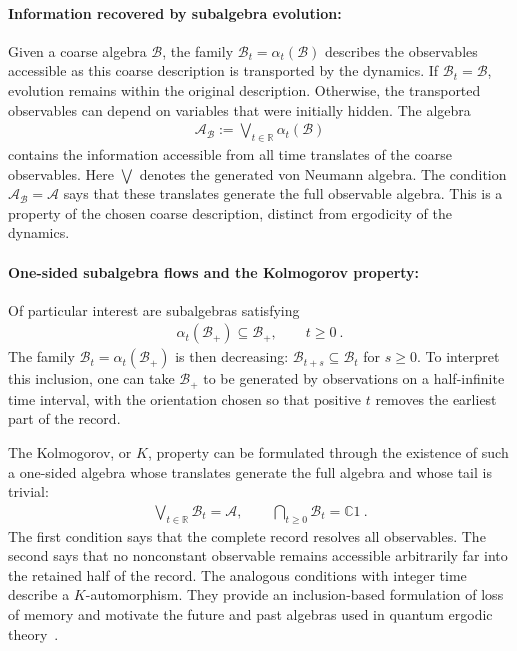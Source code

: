\documentclass[a4paper,11pt]{article}
\theoremstyle{definition}
\newcommand{\mA}{\mathcal{A}}
\newcommand{\mB}{\mathcal{B}}
\begin{document}
\paragraph{Information recovered by subalgebra evolution:}
Given a coarse algebra $\mB$, the family $\mB_t=\alpha_t(\mB)$ describes the observables accessible as this coarse description is transported by the dynamics. If $\mB_t=\mB$, evolution remains within the original description. Otherwise, the transported observables can depend on variables that were initially hidden. The algebra
\begin{align}
    \mA_{\mB}:=\bigvee_{t\in\mathbb R}\alpha_t(\mB)
\end{align}
contains the information accessible from all time translates of the coarse observables. Here $\bigvee$ denotes the generated von Neumann algebra. The condition $\mA_{\mB}=\mA$ says that these translates generate the full observable algebra. This is a property of the chosen coarse description, distinct from ergodicity of the dynamics.

\paragraph{One-sided subalgebra flows and the Kolmogorov property:}
Of particular interest are subalgebras satisfying
\begin{align}\label{eq:classical-one-sided-inclusion}
    \alpha_t(\mB_+)\subseteq\mB_+,\qquad t\geq0\ .
\end{align}
The family $\mB_t=\alpha_t(\mB_+)$ is then decreasing: $\mB_{t+s}\subseteq\mB_t$ for $s\geq0$. To interpret this inclusion, one can take $\mB_+$ to be generated by observations on a half-infinite time interval, with the orientation chosen so that positive $t$ removes the earliest part of the record.

The Kolmogorov, or $K$, property can be formulated through the existence of such a one-sided algebra whose translates generate the full algebra and whose tail is trivial:
\begin{align}\label{eq:classical-K-algebra}
    \bigvee_{t\in\mathbb R}\mB_t=\mA,
    \qquad
    \bigcap_{t\geq0}\mB_t=\mathbb C1\ .
\end{align}
The first condition says that the complete record resolves all observables. The second says that no nonconstant observable remains accessible arbitrarily far into the retained half of the record. The analogous conditions with integer time describe a $K$-automorphism. They provide an inclusion-based formulation of loss of memory and motivate the future and past algebras used in quantum ergodic theory~\cite{ouseph2024local}.
\end{document}
